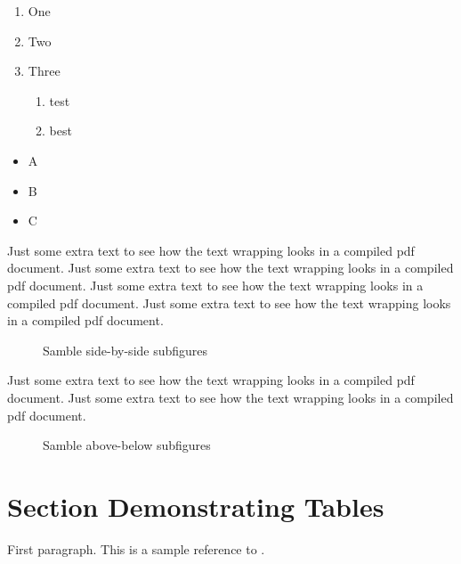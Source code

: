 \begin{enumerate}
	\packed
	\item One
	\item Two
	\item Three
	\begin{enumerate}
		\item test
		\item best
	\end{enumerate}
\end{enumerate}

\begin{itemize}
	\packed
	\item A
	\item B
	\item C
\end{itemize}

Just some extra text to see how the text wrapping looks in a
compiled pdf document. Just some extra text to see how the text
wrapping looks in a compiled pdf document. Just some extra text to
see how the text wrapping looks in a compiled pdf document. Just
some extra text to see how the text wrapping looks in a compiled
pdf document.

\begin{figure}
     \centering
      \hfil
    \caption{Samble side-by-side subfigures} \label{fig:side-by-side}
\end{figure}

Just some extra text to see how the text wrapping looks in a
compiled pdf document. Just some extra text to see how the text
wrapping looks in a compiled pdf document.

\begin{figure}
    \centering
     \hspace{24pt}
    \caption{Samble above-below subfigures} \label{fig:above-below}
\end{figure}

\section{Section Demonstrating Tables}
First paragraph.  This is a sample reference to .

